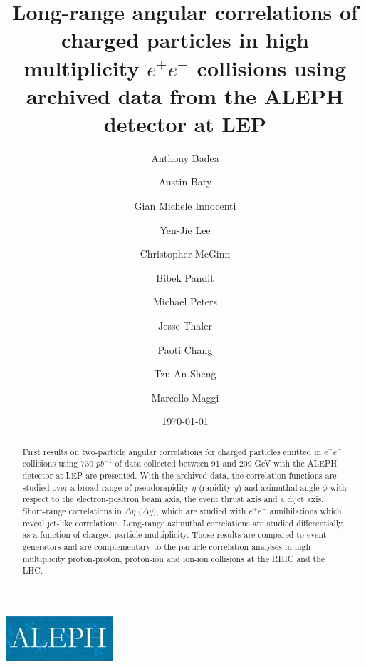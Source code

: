 \documentclass[%
preprint,
bibnotes,
]{revtex4-1}
\begin{document}
\includegraphics[width= 40mm]{aleph-logo.jpg}
\title{Long-range angular correlations of charged particles in high multiplicity $e^+e^-$ collisions using archived data from the ALEPH detector at LEP}%

\author{Anthony Badea}%
\author{Austin Baty}%
\author{Gian Michele Innocenti}%
\author{Yen-Jie Lee}
\author{Christopher McGinn}
\author{Bibek Pandit}%
\author{Michael Peters}%
\author{Jesse Thaler}%



\author{Paoti Chang}
\author{Tzu-An Sheng}

%

\author{Marcello Maggi}

\date{\today}%

\begin{abstract}
First results on two-particle angular correlations for charged particles emitted in $e^+e^-$ collisions using 730 $pb^{-1}$ of data collected between 91 and 209 GeV with the ALEPH detector at LEP are presented. With the archived data, the correlation functions are studied over a broad range of pseudorapidity $\eta$ (rapidity $y$) and azimuthal angle $\phi$ with respect to the electron-positron beam axis, the event thrust axis and a dijet axis. Short-range correlations in $\Delta\eta$ ($\Delta y$), which are studied with $e^+e^-$ annihilations which reveal jet-like correlations. Long-range azimuthal correlations are studied differentially as a function of charged particle multiplicity. Those results are compared to event generators and are complementary to the particle correlation analyses in high multiplicity proton-proton, proton-ion and ion-ion collisions at the RHIC and the LHC.
\end{abstract}
\end{document}
